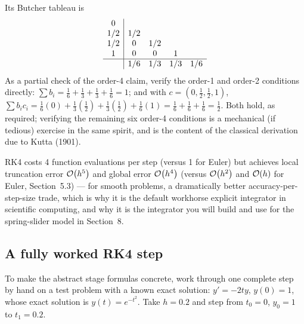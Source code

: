 Its Butcher tableau is
\begin{equation}
\begin{array}{c|cccc}
0 & & & & \\
1/2 & 1/2 & & & \\
1/2 & 0 & 1/2 & & \\
1 & 0 & 0 & 1 & \\ \hline
 & 1/6 & 1/3 & 1/3 & 1/6
\end{array}
\end{equation}
As a partial check of the order-4 claim, verify the order-1 and order-2 conditions directly: $\sum b_i = \tfrac16+\tfrac13+\tfrac13+\tfrac16 = 1$; and with $c = (0,\tfrac12,\tfrac12,1)$, $\sum b_i c_i = \tfrac16(0) + \tfrac13(\tfrac12)+\tfrac13(\tfrac12)+\tfrac16(1) = \tfrac16+\tfrac16+\tfrac16 = \tfrac12$. Both hold, as required; verifying the remaining six order-4 conditions is a mechanical (if tedious) exercise in the same spirit, and is the content of the classical derivation due to Kutta (1901).

RK4 costs 4 function evaluations per step (versus 1 for Euler) but achieves local truncation error $\mathcal{O}\!\left(h^5\right)$ and global error $\mathcal{O}\!\left(h^4\right)$ (versus $\mathcal{O}\!\left(h^2\right)$ and $\mathcal{O}\!\left(h\right)$ for Euler, Section~5.3) --- for smooth problems, a dramatically better accuracy-per-step-size trade, which is why it is the default workhorse explicit integrator in scientific computing, and why it is the integrator you will build and use for the spring-slider model in Section~8.

\subsection{A fully worked RK4 step}

To make the abstract stage formulas concrete, work through one complete step by hand on a test problem with a known exact solution: $y' = -2ty$, $y(0)=1$, whose exact solution is $y(t)=e^{-t^2}$. Take $h=0.2$ and step from $t_0=0$, $y_0=1$ to $t_1=0.2$.


